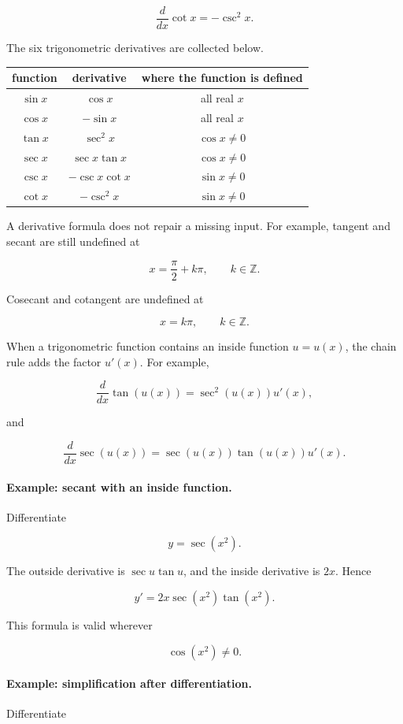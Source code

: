 \[
\boxed{
\frac{d}{dx}\cot x=-\csc^2x.
}
\]

The six trigonometric derivatives are collected below.

\begin{center}
\renewcommand{\arraystretch}{1.35}
\begin{tabular}{c|c|c}
\textbf{function}
&
\textbf{derivative}
&
\textbf{where the function is defined}
\\ \hline
\(\sin x\)
&
\(\cos x\)
&
all real \(x\)
\\
\(\cos x\)
&
\(-\sin x\)
&
all real \(x\)
\\
\(\tan x\)
&
\(\sec^2x\)
&
\(\cos x\neq0\)
\\
\(\sec x\)
&
\(\sec x\tan x\)
&
\(\cos x\neq0\)
\\
\(\csc x\)
&
\(-\csc x\cot x\)
&
\(\sin x\neq0\)
\\
\(\cot x\)
&
\(-\csc^2x\)
&
\(\sin x\neq0\)
\end{tabular}
\end{center}

A derivative formula does not repair a missing input. For example, tangent and
secant are still undefined at

\[
x=\frac{\pi}{2}+k\pi,
\qquad
k\in\mathbb Z.
\]

Cosecant and cotangent are undefined at

\[
x=k\pi,
\qquad
k\in\mathbb Z.
\]

When a trigonometric function contains an inside function \(u=u(x)\), the chain
rule adds the factor \(u'(x)\). For example,

\[
\frac{d}{dx}\tan(u(x))
=
\sec^2(u(x))u'(x),
\]

and

\[
\frac{d}{dx}\sec(u(x))
=
\sec(u(x))\tan(u(x))u'(x).
\]

\paragraph{Example: secant with an inside function.}
Differentiate

\[
y=\sec(x^2).
\]

The outside derivative is \(\sec u\tan u\), and the inside derivative is \(2x\).
Hence

\[
\boxed{
y'=2x\sec(x^2)\tan(x^2).
}
\]

This formula is valid wherever

\[
\cos(x^2)\neq0.
\]

\paragraph{Example: simplification after differentiation.}
Differentiate

